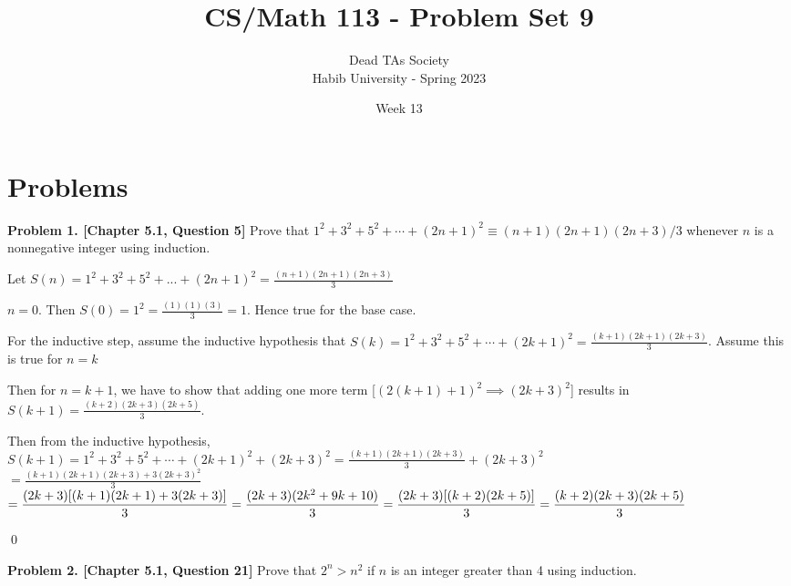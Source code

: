 \documentclass[addpoints]{exam}
\title{CS/Math 113 - Problem Set 9}
\author{Dead TAs Society \\ Habib University - Spring 2023}
\date{Week 13}
\begin{document}
\maketitle
\begin{sloppypar}
\section*{Problems}
\begin{questions}
    \question
    \textbf{Problem 1. [Chapter 5.1, Question 5]}
    Prove that $1^2 + 3^2 + 5^2 + \cdots + (2n+1)^2 \equiv (n+1)(2n+1)(2n+3)/3$ whenever $n$ is a nonnegative integer using induction.
    \begin{solution}
        
        Let $ S(n) = 1^2 + 3^2 + 5^2 + ... + (2n+1)^2 = \displaystyle\frac{(n+1)(2n+1)(2n+3)}{3}$ 

         $ n = 0 $. Then $S(0) = 1^2 = \displaystyle\frac{(1)(1)(3)}{3} = 1 $. Hence true for the base case.

         For the inductive step, assume the inductive hypothesis that $S(k) = 1^2 + 3^2 + 5^2 + \cdots + (2k+1)^2 = \displaystyle\frac{(k+1)(2k+1)(2k+3)}{3} $. Assume this is true for $n = k$

        Then for $ n = k + 1 $, we have to show that adding one more term [$ (2(k + 1) + 1)^2 \implies (2k + 3)^2 $] results in $S(k + 1) = \displaystyle\frac{(k+ 2)(2k+3)(2k+5)}{3} $.
        
        Then from the inductive hypothesis, \\ $S(k + 1) = 1^2 + 3^2 + 5^2 + \cdots + (2k+1)^2 + (2k + 3)^2 = \displaystyle\frac{(k+1)(2k+1)(2k+3)}{3} + (2k + 3)^2 $ \\ 
        $ = \displaystyle\frac{(k+1)(2k+1)(2k+3) + 3(2k + 3)^2}{3} $ \\ 
        $ = \displaystyle\frac{(2k+3)[(k+1)(2k+1) + 3(2k+3)]}{3} \\ = \displaystyle\frac{(2k+3)(2k^2 + 9k + 10)}{3} \\ = \displaystyle\frac{(2k+3)[(k+2)(2k+5)]}{3} = \displaystyle\frac{(k+2)(2k+3)(2k+5)}{3}$
        \begin{flushright}
            \qed
        \end{flushright}
    \end{solution}
    \newpage
    \question
    \textbf{Problem 2. [Chapter 5.1, Question 21]}
    Prove that $2^n > n^2$ if $n$ is an integer greater than 4 using induction.
    \begin{solution}


\end{solution}
\end{questions}
\end{sloppypar}
\end{document}
